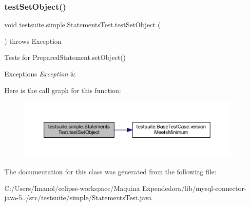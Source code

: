 \subsubsection{\texorpdfstring{test\+Set\+Object()}{testSetObject()}}
{\footnotesize\ttfamily void testsuite.\+simple.\+Statements\+Test.\+test\+Set\+Object (\begin{DoxyParamCaption}{ }\end{DoxyParamCaption}) throws Exception}

Tests for Prepared\+Statement.\+set\+Object()


\begin{DoxyExceptions}{Exceptions}
{\em Exception} & \\
\hline
\end{DoxyExceptions}
Here is the call graph for this function\+:
\nopagebreak
\begin{figure}[H]
\begin{center}
\leavevmode
\includegraphics[width=350pt]{classtestsuite_1_1simple_1_1_statements_test_acf80cede1ff53fcdebca2de611a1c015_cgraph}
\end{center}
\end{figure}


The documentation for this class was generated from the following file\+:\begin{DoxyCompactItemize}
\item 
C\+:/\+Users/\+Imanol/eclipse-\/workspace/\+Maquina Expendedora/lib/mysql-\/connector-\/java-\/5../src/testsuite/simple/Statements\+Test.\+java\end{DoxyCompactItemize}
